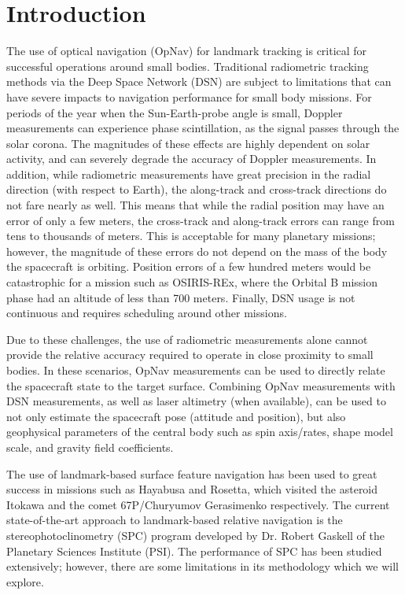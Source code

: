 \documentclass{RPI-SIW}
\begin{document}
\section*{Introduction}
The use of optical navigation (OpNav) for landmark tracking is critical for successful operations around small bodies.  Traditional radiometric tracking methods via the Deep Space Network (DSN) are subject to limitations that can have severe impacts to navigation performance for small body missions.  For periods of the year when the Sun-Earth-probe angle is small, Doppler measurements can experience phase scintillation, as the signal passes through the solar corona.  The magnitudes of these effects are highly dependent on solar activity, and can severely degrade the accuracy of Doppler measurements.\cite{dsn_handbook}  In addition, while radiometric measurements have great precision in the radial direction (with respect to Earth), the along-track and cross-track directions do not fare nearly as well. This means that while the radial position may have an error of only a few meters, the cross-track and along-track errors can range from tens to thousands of meters.   This is acceptable for many planetary missions; however, the magnitude of these errors do not depend on the mass of the body the spacecraft is orbiting.\cite{opnav_near_sb}  Position errors of a few hundred meters would be catastrophic for a mission such as OSIRIS-REx, where the Orbital B mission phase had an altitude of less than 700 meters.  Finally, DSN usage is not continuous and requires scheduling around other missions.

Due to these challenges, the use of radiometric measurements alone cannot provide the relative accuracy required to operate in close proximity to small bodies.  In these scenarios, OpNav measurements can be used to directly relate the spacecraft state to the target surface.  Combining OpNav measurements with DSN measurements, as well as laser altimetry (when available), can be used to not only estimate the spacecraft pose (attitude and position), but also geophysical parameters of the central body such as spin axis/rates, shape model scale, and gravity field coefficients.

The use of landmark-based surface feature navigation has been used to great success in missions such as Hayabusa\cite{hayabusa} and Rosetta\cite{rosetta}, which visited the asteroid Itokawa and the comet  67P/Churyumov Gerasimenko respectively.  The current state-of-the-art approach to landmark-based relative navigation is the stereophotoclinometry (SPC) program developed by Dr. Robert Gaskell of the Planetary Sciences Institute (PSI).  The performance of SPC has been studied extensively;\cite{spc_sensitiviy} however, there are some limitations in its methodology which we will explore.
\end{document}
